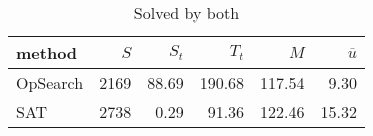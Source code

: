 \begin{table}[htbp]
\centering
\begingroup\small
\begin{tabular}{lrrrrr}
  \hline
method & $S$ & $S_t$ & $T_t$ & $M$ & $\overline{u}$ \\ 
  \hline
OpSearch & 2169 & 88.69 & 190.68 & 117.54 & 9.30 \\ 
  SAT & 2738 & 0.29 & 91.36 & 122.46 & 15.32 \\ 
   \hline
\end{tabular}
\endgroup
\caption{Solved by both} 
\label{tab:summary_both}
\end{table}
